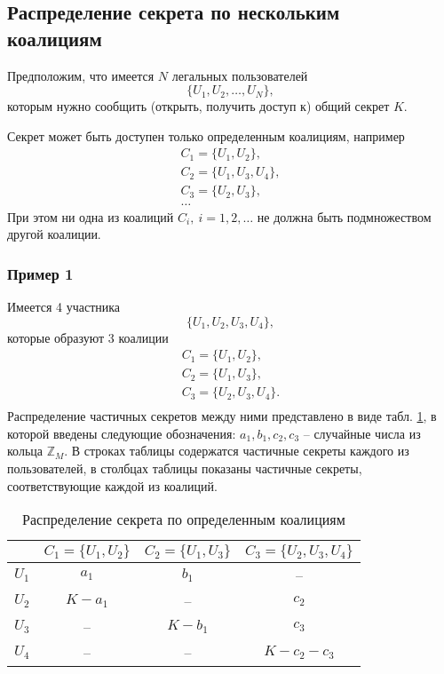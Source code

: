 \documentclass[10pt,a4paper]{book}
\newcommand{\group}[1]{\mathbb{#1}}
\newcommand{\Z}{\group{Z}}
\begin{document}
\subsection[Схема для нескольких коалиций]{Распределение секрета по нескольким \protect\\ коалициям}

Предположим, что имеется $N$ легальных пользователей
    \[ \{ U_1, U_2, \dots, U_N \}, \]
которым нужно сообщить (открыть, получить доступ к) общий секрет $K$.

Секрет может быть доступен только определенным коалициям, например
\[ \begin{array}{l}
    C_1 = \{ U_1, U_2 \}, \\
    C_2 = \{ U_1, U_3, U_4 \}, \\
    C_3 = \{ U_2, U_3 \}, \\
    \dots
\end{array} \]
При этом ни одна из коалиций $C_i, ~ i = 1, 2, \dots$ не должна быть подмножеством другой коалиции.


\subsubsection{Пример 1}

Имеется 4 участника
    \[ \{ U_1, U_2, U_3, U_4 \}, \]
которые образуют 3 коалиции
\[ \begin{array}{l}
    C_1 = \{ U_1, U_2 \}, \\
    C_2 = \{ U_1, U_3 \}, \\
    C_3 = \{ U_2, U_3, U_4 \}. \\
\end{array} \]
Распределение частичных секретов между ними представлено в виде табл. \ref{tab:secret-share-coalition-1}, в которой введены следующие обозначения: $a_1, b_1, c_2, c_3$ -- случайные числа из кольца $\Z_M$. В строках таблицы содержатся частичные секреты каждого из пользователей, в столбцах таблицы показаны частичные секреты, соответствующие каждой из коалиций.

\begin{table}[h!]
    \centering
    \caption{Распределение секрета по определенным коалициям\label{tab:secret-share-coalition-1}}
    \begin{tabular}{|c||c|c|c|}
        \hline
              & $C_1 = \{ U_1, U_2 \}$ & $C_2 = \{U_1, U_3 \}$ & $C_3 = \{ U_2, U_3, U_4 \}$ \\
        \hline \hline
        $U_1$ & $a_1$     & $b_1$     & -- \\
        $U_2$ & $K - a_1$ & --        & $c_2$ \\
        $U_3$ & --        & $K - b_1$ & $c_3$  \\
        $U_4$ & --        & --        & $K - c_2 - c_3$ \\
        \hline
    \end{tabular}
\end{table}
\end{document}
